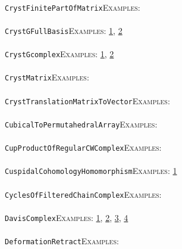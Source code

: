 \documentclass[a4paper,11pt]{report}
\begin{document}
{{ \\
 \texttt{CrystFinitePartOfMatrix}{\nobreakspace}{\nobreakspace}{\nobreakspace}{\nobreakspace}\textsc{Examples:} \\
 \\
 \texttt{CrystGFullBasis}{\nobreakspace}{\nobreakspace}{\nobreakspace}{\nobreakspace}\textsc{Examples:} \href{tutorial/chap8.html} {1}{\nobreakspace}, \href{../www/SideLinks/About/aboutBredon.html} {2}{\nobreakspace} \\
 \\
 \texttt{CrystGcomplex}{\nobreakspace}{\nobreakspace}{\nobreakspace}{\nobreakspace}\textsc{Examples:} \href{tutorial/chap8.html} {1}{\nobreakspace}, \href{../www/SideLinks/About/aboutBredon.html} {2}{\nobreakspace} \\
 \\
 \texttt{CrystMatrix}{\nobreakspace}{\nobreakspace}{\nobreakspace}{\nobreakspace}\textsc{Examples:} \\
 \\
 \texttt{CrystTranslationMatrixToVector}{\nobreakspace}{\nobreakspace}{\nobreakspace}{\nobreakspace}\textsc{Examples:} \\
 \\
 \texttt{CubicalToPermutahedralArray}{\nobreakspace}{\nobreakspace}{\nobreakspace}{\nobreakspace}\textsc{Examples:} \\
 \\
 \texttt{CupProductOfRegularCWComplex}{\nobreakspace}{\nobreakspace}{\nobreakspace}{\nobreakspace}\textsc{Examples:} \\
 \\
 \texttt{CuspidalCohomologyHomomorphism}{\nobreakspace}{\nobreakspace}{\nobreakspace}{\nobreakspace}\textsc{Examples:} \href{tutorial/chap10.html} {1}{\nobreakspace} \\
 \\
 \texttt{CyclesOfFilteredChainComplex}{\nobreakspace}{\nobreakspace}{\nobreakspace}{\nobreakspace}\textsc{Examples:} \\
 \\
 \texttt{DavisComplex}{\nobreakspace}{\nobreakspace}{\nobreakspace}{\nobreakspace}\textsc{Examples:} \href{tutorial/chap8.html} {1}{\nobreakspace}, \href{../www/SideLinks/About/aboutBredon.html} {2}{\nobreakspace}, \href{../www/SideLinks/About/aboutDavisComplex.html} {3}{\nobreakspace}, \href{../www/SideLinks/About/aboutFunctorial.html} {4}{\nobreakspace} \\
 \\
 \texttt{DeformationRetract}{\nobreakspace}{\nobreakspace}{\nobreakspace}{\nobreakspace}\textsc{Examples:} \\
}}
\end{document}
